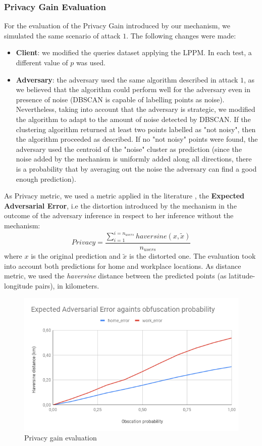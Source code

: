\documentclass[10pt,conference,compsocconf]{IEEEtran}
\begin{document}
\subsubsection{Privacy Gain Evaluation}
For the evaluation of the Privacy Gain introduced by our mechanism, we simulated
the same scenario of attack $1$. The following changes were made:
\begin{itemize}
    \item \textbf{Client}: we modified the queries dataset applying the LPPM. In
    each test, a different value of $p$ was used.
    \item \textbf{Adversary}: the adversary used the same algorithm described in
    attack $1$, as we believed that the algorithm could perform well for the
    adversary even in presence of noise (DBSCAN is capable of labelling points
    as noise). Nevertheless, taking into account that the adversary is
    strategic, we modified the algorithm to adapt to the amount of noise
    detected by DBSCAN. If the clustering algorithm returned at least two points
    labelled as "not noisy", then the algorithm proceeded as described. If no
    "not noisy" points were found, the adversary used the centroid of the
    "noise" cluster as prediction (since the noise added by the mechanism is
    uniformly added along all directions, there is a probability that by
    averaging out the noise the adversary can find a good enough prediction).
\end{itemize}
As Privacy metric, we used a metric applied in the literature \cite{Shokri}, the
\textbf{Expected Adversarial Error}, i.e the distortion introduced by the
mechanism in the outcome of the adversary inference in respect to her inference
without the mechanism:
\[Privacy = \frac{\sum_{i=1}^{i=n_{users}}haversine(x, \tilde{x})}{n_{users}}\] where $x$ is the
original prediction and $\tilde{x}$ is the distorted one. The evaluation took
into account both predictions for home and workplace locations. As distance
metric, we used the \textit{haversine} distance between the predicted points (as
latitude-longitude pairs), in kilometers.
    \begin{figure}[h!]
        \centering
        \includegraphics[width=0.9\linewidth]{../privacy_evaluation/adv_error.png}
        \caption{Privacy gain evaluation}
    \end{figure}
\end{document}
